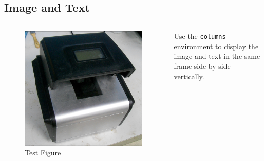 \documentclass[
        ]{beamer}
\begin{document}
\subsection{Image and Text}
\begin{frame}[t]{\subsecname} %
    \begin{columns}
        \begin{figure}
        \centering
        \includegraphics[width=\textwidth]{im/testim}
        \caption{Test Figure}
        \end{figure}
        Use the \texttt{columns} environment to display the image and text in the same frame side by side vertically.
    \end{columns}
\end{frame}
\end{document}
